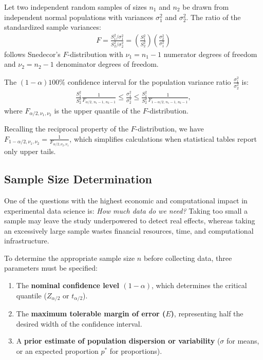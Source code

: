 \begin{teorema}
	Let two independent random samples of sizes $n_1$ and $n_2$ be drawn from independent normal populations with variances $\sigma_1^2$ and $\sigma_2^2$. The ratio of the standardized sample variances:
	\begin{align}
		F = \frac{S_1^2 / \sigma_1^2}{S_2^2 / \sigma_2^2} = \left(\frac{S_1^2}{S_2^2}\right)\left(\frac{\sigma_2^2}{\sigma_1^2}\right)
	\end{align}
	follows Snedecor's $F$-distribution with $\nu_1 = n_1 - 1$ numerator degrees of freedom and $\nu_2 = n_2 - 1$ denominator degrees of freedom.
	
	The $(1-\alpha)100\%$ confidence interval for the population variance ratio $\frac{\sigma_1^2}{\sigma_2^2}$ is:
	\begin{align}
		\frac{S_1^2}{S_2^2} \frac{1}{F_{\alpha/2, \, n_1-1, \, n_2-1}} \leq \frac{\sigma_1^2}{\sigma_2^2} \leq \frac{S_1^2}{S_2^2} \frac{1}{F_{1-\alpha/2, \, n_1-1, \, n_2-1}},
	\end{align}
	where $F_{\alpha/2, \nu_1, \nu_2}$ is the upper quantile of the $F$-distribution. 
	
	Recalling the reciprocal property of the $F$-distribution, we have $F_{1-\alpha/2, \nu_1, \nu_2} = \frac{1}{F_{\alpha/2, \nu_2, \nu_1}}$, which simplifies calculations when statistical tables report only upper tails.
\end{teorema}

\subsection{Sample Size Determination}

One of the questions with the highest economic and computational impact in experimental data science is: \emph{How much data do we need?} Taking too small a sample may leave the study underpowered to detect real effects, whereas taking an excessively large sample wastes financial resources, time, and computational infrastructure.

To determine the appropriate sample size $n$ before collecting data, three parameters must be specified:
\begin{enumerate}
	\item The \textbf{nominal confidence level $(1-\alpha)$}, which determines the critical quantile ($Z_{\alpha/2}$ or $t_{\alpha/2}$).
	\item The \textbf{maximum tolerable margin of error ($E$)}, representing half the desired width of the confidence interval.
	\item A \textbf{prior estimate of population dispersion or variability} ($\sigma$ for means, or an expected proportion $p^*$ for proportions).
\end{enumerate}

